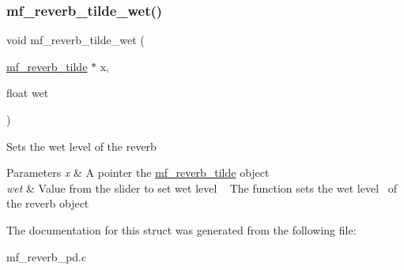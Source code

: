 \subsubsection{\texorpdfstring{mf\+\_\+reverb\+\_\+tilde\+\_\+wet()}{mf\_reverb\_tilde\_wet()}}
{\footnotesize\ttfamily void mf\+\_\+reverb\+\_\+tilde\+\_\+wet (\begin{DoxyParamCaption}\item[{\mbox{\hyperlink{structmf__reverb__tilde}{mf\+\_\+reverb\+\_\+tilde}} $\ast$}]{x,  }\item[{float}]{wet }\end{DoxyParamCaption})\hspace{0.3cm}{\ttfamily [related]}}



Sets the wet level of the reverb~\newline
 


\begin{DoxyParams}{Parameters}
{\em x} & A pointer the \mbox{\hyperlink{structmf__reverb__tilde}{mf\+\_\+reverb\+\_\+tilde}} object ~\newline
 \\
\hline
{\em wet} & Value from the slider to set wet level ~\newline
 The function sets the wet level~\newline
 of the reverb object \\
\hline
\end{DoxyParams}


The documentation for this struct was generated from the following file\+:\begin{DoxyCompactItemize}
\item 
mf\+\_\+reverb\+\_\+pd.\+c\end{DoxyCompactItemize}
